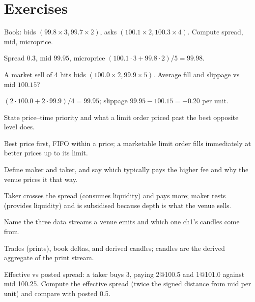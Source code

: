 \section*{Exercises}
\begin{exercise}[easy]
Book: bids $(99.8\!\times\!3, 99.7\!\times\!2)$, asks
$(100.1\!\times\!2, 100.3\!\times\!4)$. Compute spread, mid,
microprice.
\end{exercise}
\begin{solution}
Spread $0.3$, mid $99.95$, microprice
$(100.1\!\cdot\!3+99.8\!\cdot\!2)/5=99.98$.
\end{solution}
\begin{exercise}[easy]
A market sell of 4 hits bids $(100.0\!\times\!2,99.9\!\times\!5)$.
Average fill and slippage vs mid $100.15$?
\end{exercise}
\begin{solution}
$(2\!\cdot\!100.0+2\!\cdot\!99.9)/4=99.95$; slippage
$99.95-100.15=-0.20$ per unit.
\end{solution}
\begin{exercise}[easy]
State price--time priority and what a limit order priced past the
best opposite level does.
\end{exercise}
\begin{solution}
Best price first, FIFO within a price; a marketable limit order
fills immediately at better prices up to its limit.
\end{solution}
\begin{exercise}[easy]
Define maker and taker, and say which typically pays the higher
fee and why the venue prices it that way.
\end{exercise}
\begin{solution}
Taker crosses the spread (consumes liquidity) and pays more; maker
rests (provides liquidity) and is subsidised because depth is what
the venue sells.
\end{solution}
\begin{exercise}[easy]
Name the three data streams a venue emits and which one ch1's
candles come from.
\end{exercise}
\begin{solution}
Trades (prints), book deltas, and derived candles; candles are the
derived aggregate of the print stream.
\end{solution}
\begin{exercise}[medium]
Effective vs posted spread: a taker buys 3, paying 2@100.5 and
1@101.0 against mid 100.25. Compute the effective spread (twice the
signed distance from mid per unit) and compare with posted 0.5.
\end{exercise}
